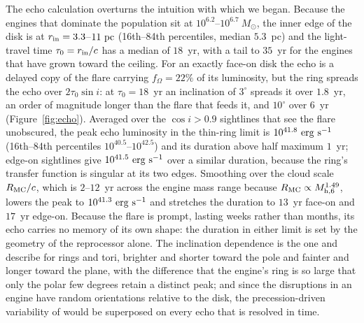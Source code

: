 \documentclass[twocolumn,pdftex]{aastex701}
\newcommand{\msun}{M_{\odot}\xspace}
\newcommand{\mhsix}{M_{\rm h,6}\xspace}
\newcommand{\fom}{f_{\Omega}\xspace}
\begin{document}
The echo calculation overturns the intuition with which we began. Because the engines that dominate the population sit at $10^{6.2}$--$10^{6.7}~\msun$, the inner edge of the disk is at $r_{\rm in} = 3.3$--$11~{\rm pc}$ (16th--84th percentiles, median $5.3$~pc) and the light-travel time $\tau_{0} = r_{\rm in}/c$ has a median of $18$~yr, with a tail to $35$~yr for the engines that have grown toward the ceiling. For an exactly face-on disk the echo is a delayed copy of the flare carrying $\fom = 22\%$ of its luminosity, but the ring spreads the echo over $2 \tau_{0} \sin i$: at $\tau_{0} = 18$~yr an inclination of $3^{\circ}$ spreads it over $1.8$~yr, an order of magnitude longer than the flare that feeds it, and $10^{\circ}$ over $6$~yr (Figure~\ref{fig:echo}). Averaged over the $\cos i > 0.9$ sightlines that see the flare unobscured, the peak echo luminosity in the thin-ring limit is $10^{41.8}~{\rm erg~s^{-1}}$ (16th--84th percentiles $10^{40.5}$--$10^{42.5}$) and its duration above half maximum $1$~yr; edge-on sightlines give $10^{41.5}~{\rm erg~s^{-1}}$ over a similar duration, because the ring's transfer function is singular at its two edges. Smoothing over the cloud scale $R_{\rm MC}/c$, which is $2$--$12$~yr across the engine mass range because $R_{\rm MC} \propto \mhsix^{1.49}$, lowers the peak to $10^{41.3}~{\rm erg~s^{-1}}$ and stretches the duration to $13$~yr face-on and $17$~yr edge-on. Because the flare is prompt, lasting weeks rather than months, its echo carries no memory of its own shape: the duration in either limit is set by the geometry of the reprocessor alone. The inclination dependence is the one \citet{Eyles-Ferris:2026a} and \citet{Tuna:2025a} describe for rings and tori, brighter and shorter toward the pole and fainter and longer toward the plane, with the difference that the engine's ring is so large that only the polar few degrees retain a distinct peak; and since the disruptions in an engine have random orientations relative to the disk, the precession-driven variability of \citet{Wu:2026a} would be superposed on every echo that is resolved in time.
\end{document}
